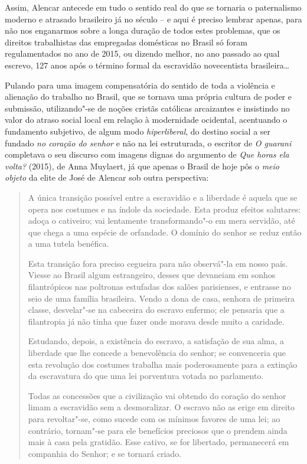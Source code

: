 Assim, Alencar antecede em tudo o sentido real do que se tornaria o
paternalismo moderno e atrasado brasileiro já no século  -- e aqui é
preciso lembrar apenas, para não nos enganarmos sobre a longa duração de
todos estes problemas, que os direitos trabalhistas das empregadas
domésticas no Brasil só foram regulamentados no ano de 2015, ou dizendo
melhor, no ano passado ao qual escrevo, 127 anos após o término formal
da escravidão novecentista brasileira\ldots{}

Pulando para uma imagem compensatória do sentido de toda a violência e
alienação do trabalho no Brasil, que se tornava uma própria cultura de
poder e submissão, utilizando"-se de noções cristãs católicas arcaizantes
e insistindo no valor do atraso social local em relação à modernidade
ocidental, acentuando o fundamento subjetivo, de algum modo
\emph{hiperliberal}, do destino social a ser fundado \emph{no coração do
senhor} e não na lei estruturada, o escritor de \emph{O guarani}
completava o seu discurso com imagens dignas do argumento de \emph{Que
horas ela volta?} (2015), de Anna Muylaert, já que apenas o Brasil de
hoje pôs o \emph{meio objeto} da elite de José de Alencar sob outra
perspectiva:

\begin{quote}
A única transição possível entre a escravidão e a liberdade é aquela
que se opera nos costumes e na índole da sociedade. Esta produz efeitos
salutares: adoça o cativeiro; vai lentamente transformando"-o em mera
servidão, até que chega a uma espécie de orfandade. O domínio do senhor
se reduz então a uma tutela benéfica.

Esta transição fora preciso
cegueira para não observá"-la em nosso país. Viesse ao Brasil algum
estrangeiro, desses que devaneiam em sonhos filantrópicos nas poltronas
estufadas dos salões parisienses, e entrasse no seio de uma família
brasileira. Vendo a dona de casa, senhora de primeira classe,
desvelar"-se na cabeceira do escravo enfermo; ele pensaria que a
filantropia já não tinha que fazer onde morava desde muito a caridade.

Estudando, depois, a existência do escravo, a satisfação de sua alma,
a liberdade que lhe concede a benevolência do senhor; se convenceria que
esta revolução dos costumes trabalha mais poderosamente para a extinção
da escravatura do que uma lei porventura votada no parlamento.

Todas as concessões que a civilização vai obtendo do coração do senhor limam a
escravidão sem a desmoralizar. O escravo não as erige em direito para
revoltar"-se, como sucede com os mínimos favores de uma lei; ao
contrário, tornam"-se para ele benefícios preciosos que o prendem ainda
mais à casa pela gratidão. Esse cativo, se for libertado, permanecerá em
companhia do Senhor; e se tornará criado.
\end{quote}

